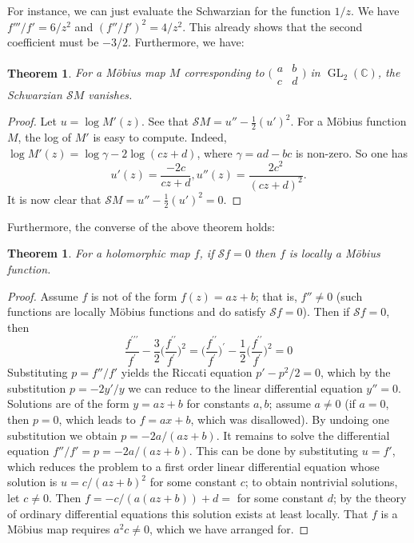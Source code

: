 \documentclass[11pt,leqno]{article}
\theoremstyle{plain}
\newtheorem{theorem}[lem]{Theorem}
\theoremstyle{definition}
\numberwithin{equation}{section}
\numberwithin{lem}{section}
\DeclareMathOperator{\GL}{GL}
\begin{document}
For instance, we can just evaluate the Schwarzian for the function $1/z$. We have $f'''/f' = 6/z^2$ and $(f''/f')^2 = 4/z^2$. This already shows that the second coefficient must be $-3/2$. Furthermore, we have: 

\begin{theorem}
    For a M\"obius map $M$ corresponding to $\big(\!\begin{smallmatrix}
        a & b \\ c & d
    \end{smallmatrix}\!\big)$ in $\GL_2 (\mathbb C)$, the Schwarzian $\mathscr SM$ vanishes.
\end{theorem}
\begin{proof}
    Let $u = \log M'(z)$. See that $\mathscr SM = u''-\frac12 (u')^2$. For a M\"obius function $M$, the log of $M'$ is easy to compute. Indeed, $\log M'(z) = \log \gamma - 2 \log (cz+d)$, where $\gamma = ad-bc$ is non-zero. So one has $$u'(z) = \frac{-2c}{cz+d}, u''(z) = \frac{2c^2}{(cz+d)^2}.$$ It is now clear that $\mathscr SM = u'' - \frac 12 (u')^2 = 0$.
\end{proof}
Furthermore, the converse of the above theorem holds: 
\begin{theorem}
    For a holomorphic map $f$, if $\mathscr Sf = 0$ then $f$ is locally a M\"obius function.
\end{theorem}
\begin{proof}
    Assume $f$ is not of the form $f(z) = az+b$; that is, $f''\neq 0$ (such functions are locally M\"obius functions and do satisfy $\mathscr Sf = 0$). Then if $\mathscr Sf = 0$, then
    \[\frac{f^{\prime\prime\prime}}{f^\prime}-\frac{3}{2}\biggl(\frac{f^{\prime\prime}}{f^\prime}\biggr)^2 = \biggl(\frac{f^{\prime\prime}}{f^\prime}\biggr)^\prime - \frac{1}{2}\biggl(\frac{f^{\prime\prime}}{f^\prime}\biggr)^2 = 0\]
    Substituting $p = f''/f'$ yields the Riccati equation $p'-p^2/2 = 0$, which by the substitution $p = -2y'/y$ we can reduce to the linear differential equation $y'' = 0$. Solutions are of the form $y = az+b$ for constants $a,b$; assume $a\neq 0$ (if $a = 0$, then $p = 0$, which leads to $f = ax+b$, which was disallowed). By undoing one substitution we obtain $p = -2a/(az+b)$. It remains to solve the differential equation $f''/f' = p = -2a/(az+b)$. This can be done by substituting $u = f'$, which reduces the problem to a first order linear differential equation whose solution is $u = c/(az+b)^2$ for some constant $c$; to obtain nontrivial solutions, let $c\neq 0$. Then $f = -c/(a(az+b)) + d = $ for some constant $d$; by the theory of ordinary differential equations this solution exists at least locally. That $f$ is a M\"obius map requires $a^2c\neq 0$, which we have arranged for.
\end{proof}
\end{document}
